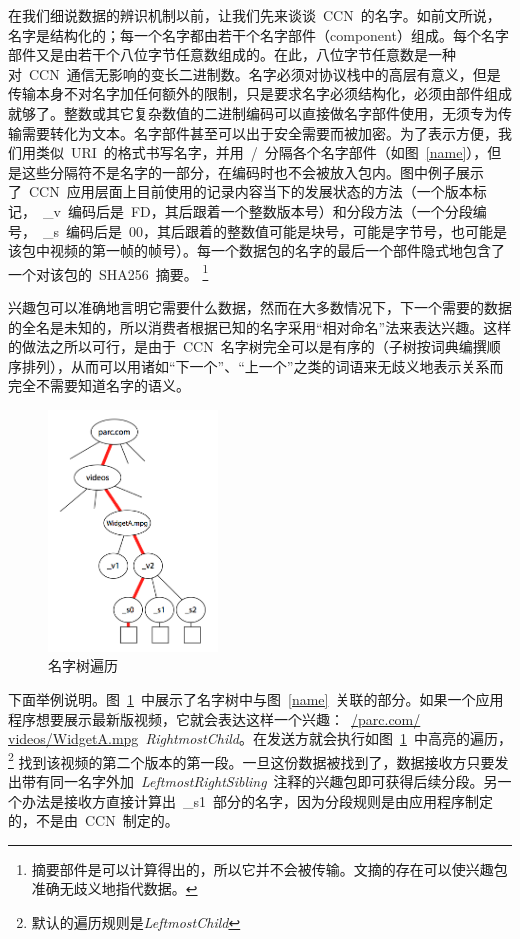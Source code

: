 在我们细说数据的辨识机制以前，让我们先来谈谈~CCN~的名字。如前文所说，名字是结构化的；每一个名字都由若干个名字部件（component）组成。每个名字部件又是由若干个八位字节任意数组成的。在此，八位字节任意数是一种对~CCN~通信无影响的变长二进制数。名字必须对协议栈中的高层有意义，但是传输本身不对名字加任何额外的限制，只是要求名字必须结构化，必须由部件组成就够了。整数或其它复杂数值的二进制编码可以直接做名字部件使用，无须专为传输需要转化为文本。名字部件甚至可以出于安全需要而被加密。为了表示方便，我们用类似~URI~的格式书写名字，并用~\slash~分隔各个名字部件（如图~\ref{name}），但是这些分隔符不是名字的一部分，在编码时也不会被放入包内。图中例子展示了~CCN~应用层面上目前使用的记录内容当下的发展状态的方法（一个版本标记，~\_v~编码后是~FD，其后跟着一个整数版本号）和分段方法（一个分段编号，~\_s~编码后是~00，其后跟着的整数值可能是块号，可能是字节号，也可能是该包中视频的第一帧的帧号）。每一个数据包的名字的最后一个部件隐式地包含了一个对该包的~SHA256~摘要。
\renewcommand\baselinestretch{1} %
\footnote{摘要部件是可以计算得出的，所以它并不会被传输。文摘的存在可以使兴趣包准确无歧义地指代数据。} %

兴趣包可以准确地言明它需要什么数据，然而在大多数情况下，下一个需要的数据的全名是未知的，所以消费者根据已知的名字采用“相对命名”法来表达兴趣。这样的做法之所以可行，是由于~CCN~名字树完全可以是有序的（子树按词典编撰顺序排列），从而可以用诸如“下一个”、“上一个”之类的词语来无歧义地表示关系而完全不需要知道名字的语义。

\begin{figure}[htbp]
  \centering
  \includegraphics[width=0.4\textwidth]{images/name_tree}
  \caption{名字树遍历} 
  \label{name_tree}
\end{figure}

下面举例说明。图~\ref{name_tree}~中展示了名字树中与图~\ref{name}~关联的部分。如果一个应用程序想要展示最新版视频，它就会表达这样一个兴趣：~\url{/parc.com/ videos/WidgetA.mpg}~\emph{RightmostChild}。在发送方就会执行如图~\ref{name_tree}~中高亮的遍历，
\renewcommand\baselinestretch{1} %
\footnote{默认的遍历规则是\emph{LeftmostChild}}
找到该视频的第二个版本的第一段。一旦这份数据被找到了，数据接收方只要发出带有同一名字外加~\emph{LeftmostRightSibling}~注释的兴趣包即可获得后续分段。另一个办法是接收方直接计算出~\_s1~部分的名字，因为分段规则是由应用程序制定的，不是由~CCN~制定的。

